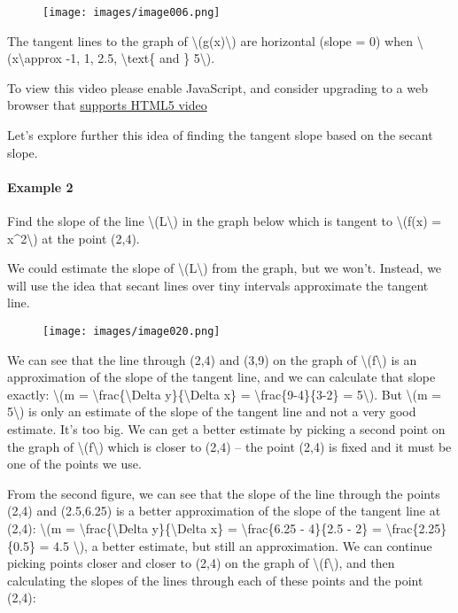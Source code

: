 \begin{figure}
\centering
\texttt{[image: images/image006.png]}
\caption{}
\end{figure}

The tangent lines to the graph of \textbackslash{}(g(x)\textbackslash{})
are horizontal (slope = 0) when \textbackslash{}(x\textbackslash{}approx
-1, 1, 2.5, \textbackslash{}text\{ and \} 5\textbackslash{}).

To view this video please enable JavaScript, and consider upgrading to a
web browser that \href{http://videojs.com/html5-video-support/}{supports
HTML5 video}

Let's explore further this idea of finding the tangent slope based on
the secant slope.

\hypertarget{example-2}{%
\paragraph{Example 2}\label{example-2}}

Find the slope of the line \textbackslash{}(L\textbackslash{}) in the
graph below which is tangent to \textbackslash{}(f(x) =
x\^{}2\textbackslash{}) at the point (2,4).

We could estimate the slope of \textbackslash{}(L\textbackslash{}) from
the graph, but we won't. Instead, we will use the idea that secant lines
over tiny intervals approximate the tangent line.

\begin{figure}
\centering
\texttt{[image: images/image020.png]}
\caption{}
\end{figure}

We can see that the line through (2,4) and (3,9) on the graph of
\textbackslash{}(f\textbackslash{}) is an approximation of the slope of
the tangent line, and we can calculate that slope exactly:
\textbackslash{}(m = \textbackslash{}frac\{\textbackslash{}Delta
y\}\{\textbackslash{}Delta x\} = \textbackslash{}frac\{9-4\}\{3-2\} =
5\textbackslash{}). But \textbackslash{}(m = 5\textbackslash{}) is only
an estimate of the slope of the tangent line and not a very good
estimate. It's too big. We can get a better estimate by picking a second
point on the graph of \textbackslash{}(f\textbackslash{}) which is
closer to (2,4) -- the point (2,4) is fixed and it must be one of the
points we use.

From the second figure, we can see that the slope of the line through
the points (2,4) and (2.5,6.25) is a better approximation of the slope
of the tangent line at (2,4): \textbackslash{}(m =
\textbackslash{}frac\{\textbackslash{}Delta y\}\{\textbackslash{}Delta
x\} = \textbackslash{}frac\{6.25 - 4\}\{2.5 - 2\} =
\textbackslash{}frac\{2.25\}\{0.5\} = 4.5 \textbackslash{}), a better
estimate, but still an approximation. We can continue picking points
closer and closer to (2,4) on the graph of
\textbackslash{}(f\textbackslash{}), and then calculating the slopes of
the lines through each of these points and the point (2,4):

